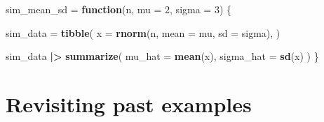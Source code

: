 \documentclass[
]{article}
\newenvironment{Shaded}{\begin{snugshade}}{\end{snugshade}}
\newcommand{\AttributeTok}[1]{\textcolor[rgb]{0.13,0.29,0.53}{#1}}
\newcommand{\ControlFlowTok}[1]{\textcolor[rgb]{0.13,0.29,0.53}{\textbf{#1}}}
\newcommand{\DecValTok}[1]{\textcolor[rgb]{0.00,0.00,0.81}{#1}}
\newcommand{\FunctionTok}[1]{\textcolor[rgb]{0.13,0.29,0.53}{\textbf{#1}}}
\newcommand{\NormalTok}[1]{#1}
\newcommand{\OtherTok}[1]{\textcolor[rgb]{0.56,0.35,0.01}{#1}}
\newcommand{\SpecialCharTok}[1]{\textcolor[rgb]{0.81,0.36,0.00}{\textbf{#1}}}
\begin{document}
\begin{Shaded}
\begin{Highlighting}[]
\NormalTok{sim\_mean\_sd }\OtherTok{=} \ControlFlowTok{function}\NormalTok{(n, }\AttributeTok{mu =} \DecValTok{2}\NormalTok{, }\AttributeTok{sigma =} \DecValTok{3}\NormalTok{) \{}
  
\NormalTok{  sim\_data }\OtherTok{=} \FunctionTok{tibble}\NormalTok{(}
    \AttributeTok{x =} \FunctionTok{rnorm}\NormalTok{(n, }\AttributeTok{mean =}\NormalTok{ mu, }\AttributeTok{sd =}\NormalTok{ sigma),}
\NormalTok{  )}
  
\NormalTok{  sim\_data }\SpecialCharTok{|\textgreater{}} 
    \FunctionTok{summarize}\NormalTok{(}
      \AttributeTok{mu\_hat =} \FunctionTok{mean}\NormalTok{(x),}
      \AttributeTok{sigma\_hat =} \FunctionTok{sd}\NormalTok{(x)}
\NormalTok{    )}
\NormalTok{\}}
\end{Highlighting}
\end{Shaded}

\section{Revisiting past examples}\label{revisiting-past-examples}
\end{document}
